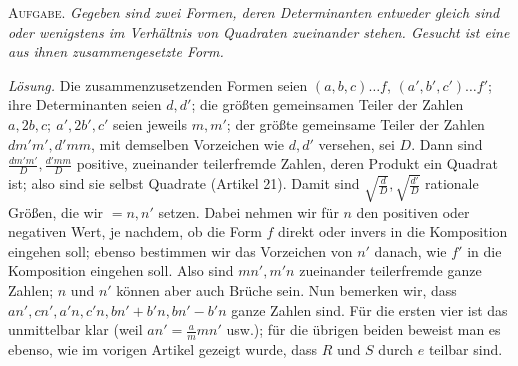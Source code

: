 \textsc{Aufgabe.} \textit{Gegeben sind zwei Formen, deren Determinanten entweder gleich sind oder wenigstens im Verhältnis von Quadraten zueinander stehen. Gesucht ist eine aus ihnen zusammengesetzte Form.}

\textit{Lösung.} Die zusammenzusetzenden Formen seien $(a,b,c)\ldots f$, $(a',b',c')\ldots f'$; ihre Determinanten seien $d,d'$; die größten gemeinsamen Teiler der Zahlen $a,\allowbreak 2b,\allowbreak c;\allowbreak \ a',\allowbreak 2b',\allowbreak c'$ seien jeweils $m,m'$; der größte gemeinsame Teiler der Zahlen $dm'm',d'mm$, mit demselben Vorzeichen wie $d,d'$
versehen, sei $D$. Dann sind $\frac{dm'm'}{D},\frac{d'mm}{D}$ positive, zueinander teilerfremde Zahlen, deren Produkt ein Quadrat ist; also sind sie selbst Quadrate (Artikel 21). Damit sind $\sqrt{\frac{d}{D}},\sqrt{\frac{d'}{D}}$ rationale Größen, die wir $=n,n'$ setzen. Dabei nehmen wir für $n$ den positiven oder negativen Wert, je nachdem, ob die Form $f$ direkt oder invers in die Komposition eingehen soll; ebenso bestimmen wir das Vorzeichen von $n'$ danach, wie $f'$ in die Komposition eingehen soll. Also sind $mn',m'n$ zueinander teilerfremde ganze Zahlen; $n$ und $n'$ können aber auch Brüche sein. Nun bemerken wir, dass $an',cn',a'n,c'n,bn'+b'n,bn'-b'n$ ganze Zahlen sind. Für die ersten vier ist das unmittelbar klar (weil $an'=\frac{a}{m}mn'$ usw.); für die übrigen beiden beweist man es ebenso, wie im vorigen Artikel gezeigt wurde, dass $R$ und $S$ durch $e$ teilbar sind.

